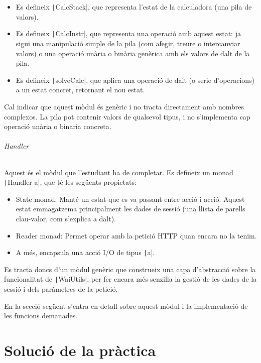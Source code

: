 \documentclass[catalan, a4paper]{scrartcl}
\begin{document}
\begin{itemize}
\item Es defineix \texttt|CalcStack|, que
representa l'estat de la calculadora (una pila de valors).
\item Es defineix \texttt|CalcInstr|, que representa
una operació amb aquest estat: ja sigui una manipulació simple
de la pila (com afegir, treure o intercanviar valors) o una operació
unària o binària genèrica amb els valors de dalt de la pila.
\item Es defineix \texttt|solveCalc|, que aplica una operació de dalt (o serie d'operacions) a un estat concret, retornant el nou estat.
\end{itemize}

Cal indicar que aquest mòdul és genèric i no tracta directament amb
nombres complexos. La pila pot contenir valors de qualsevol tipus,
i no s'implementa cap operació unària o binaria concreta.

\paragraph{Handler} Aquest és el mòdul que l'estudiant ha de completar.
Es defineix un monad \texttt|Handler a|, que té les següents propietats:

\begin{itemize}
\item State monad: Manté un estat que es va passant entre acció i acció.
Aquest estat emmagatzema principalment les dades de sessió (una llista de parells clau-valor, com
s'explica a dalt).
\item Reader monad: Permet operar amb la petició HTTP quan encara no la tenim.
\item A més, encapsula una acció I/O de tipus \texttt|a|.
\end{itemize}

Es tracta doncs d'un mòdul genèric que construeix una capa d'abstracció
sobre la funcionalitat de \texttt|WaiUtils|, per fer encara més senzilla
la gestió de les dades de la sessió i dels paràmetres de la petició.

En la secció següent s'entra en detall sobre aquest mòdul i la implementació
de les funcions demanades.

\clearpage

\part{Solució de la pràctica}
\end{document}
